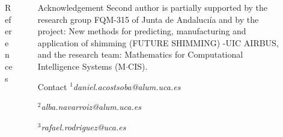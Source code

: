 \documentclass[final]{beamer}
\newlength{\sepmargin}
\newlength{\sepwid}
\newlength{\onecolwid}
\begin{document}
\begin{frame}[t]
  \vspace*{-1cm}
  \begin{columns}[t] %

    \begin{column}{\sepmargin} \end{column}
    \begin{column}{\onecolwid}
      \begin{block}{\large References}
        \vspace*{-0.5cm}
        \nocite{*} %
        {\footnotesize
          }
      \end{block}
    \end{column} %
    \begin{column}{\sepwid}  \end{column}

    \begin{column}{\onecolwid}
      \begin{block}{\large Acknowledgement}
        \vspace*{-0.5cm}
        \footnotesize Second author is partially supported by the research group FQM-315 of Junta de Andalucı\'ia and by the project: New methods for predicting, manufacturing and application of shimming (FUTURE SHIMMING) -UIC AIRBUS, and the research team: Mathematics for Computational Intelligence Systems (M$\cdot$CIS).
      \end{block}
      \vspace*{-0.5cm}

      \begin{block}{\large Contact}
        \vspace*{-0.5cm}
        \footnotesize
        $^1$\emph{daniel.acostsoba@alum.uca.es}

        $^2$\emph{alba.navarroiz@alum.uca.es}

        $^3$\emph{rafael.rodriguez@uca.es}
      \end{block}
    \end{column}

    \begin{column}{\sepmargin}\end{column} %



  \end{columns} %

\end{frame} %
\end{document}
